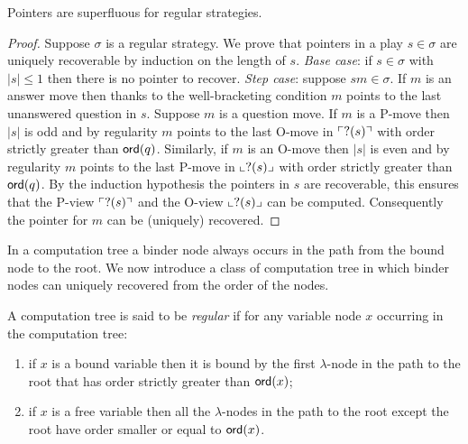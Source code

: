 \begin{lem}
\label{lem:regular_pointers_uniqu_recover}
Pointers are superfluous for regular strategies.
\end{lem}
\begin{proof}
Suppose $\sigma$ is a regular strategy. We prove that pointers in a play $s\in \sigma$ are uniquely recoverable by induction on the length of $s$.
\noindent \emph{Base case}: if $s \in \sigma$ with $|s| \leq 1$ then there is no pointer to recover.
\noindent \emph{Step case}: suppose $s m \in \sigma$. If $m$ is an answer move then
thanks to the well-bracketing condition $m$ points to the last unanswered question in $s$.
Suppose $m$ is a question move.
If $m$ is a P-move then $|s|$ is odd and by regularity
$m$ points to the last O-move in $\ulcorner ?(s) \urcorner$ with order strictly greater than ${\sf ord}(q)$.
Similarly, if $m$ is an O-move then $|s|$ is even and by regularity
$m$ points to the last P-move in $\llcorner ?(s) \lrcorner$ with order strictly greater than ${\sf ord}(q)$.
By the induction hypothesis the pointers in $s$ are recoverable, this ensures that the
P-view $\ulcorner ?(s) \urcorner$ and the O-view $\llcorner ?(s) \lrcorner$ can be computed. Consequently the pointer for $m$ can be (uniquely) recovered.
\end{proof}


In a computation tree a binder node always occurs in the path from the bound node to the root. We now introduce a
class of computation tree in which binder nodes can uniquely recovered from the order of the nodes.

\begin{dfn}
A computation tree is said to be \emph{regular} if
for any variable node $x$ occurring in the computation tree:
\begin{enumerate}
\item if $x$ is a bound variable then it is bound by the first $\lambda$-node in the path to the root that has
order strictly greater than ${\sf ord}(x)$;
\item if $x$ is a free variable then all the $\lambda$-nodes in the path to the root except the root have order
smaller or equal to ${\sf ord}(x)$.
\end{enumerate}
\end{dfn}

